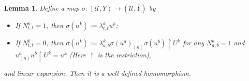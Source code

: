 \documentclass{article}
\newtheorem{lemma}{Lemma}[section]
\begin{document}


\begin{lemma}
Define a map
$\sigma:(\mathcal{U},Y)\to(\mathcal{U},\overline{Y})$ 
by
\begin{itemize}
\item If $N_{t,t}^k=1$, then $\sigma(u^k):=\lambda_{t,t}^k u^k$;
\item If $N_{t,t}^k=0$, then $\sigma(u^k):=\lambda_{a,b}^k \sigma(u^a)_{(n)}\sigma(u^b)\restriction U^k$ for any $N_{a,b}^k=1$ and $u^a_{(n)}u^b\restriction U^k=u^k$ (Here $\restriction$ is the restriction),
\end{itemize} 
and linear expansion.
Then it is a well-defined homomorphism.
\end{lemma}
\end{document}
